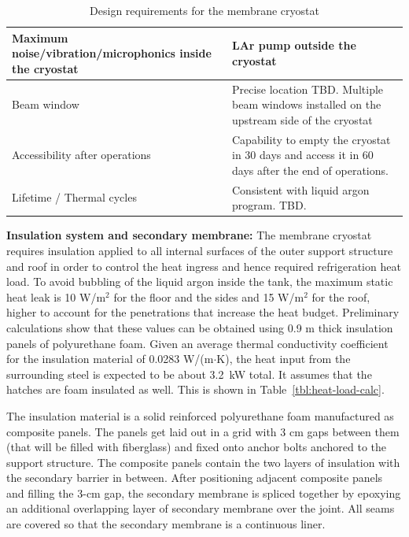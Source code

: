 \begin{table}[htpb]
\begin{tabular}{|p{}|p{}|}
Maximum noise/vibration/microphonics inside the cryostat   & LAr pump outside the cryostat  \\ \hline
Beam window   & Precise location TBD. Multiple beam windows installed on the upstream side of the cryostat  \\ \hline
 Accessibility after operations  & Capability to empty the cryostat in 30 days and access it in 60 days after the end of operations. \\ \hline
  Lifetime / Thermal cycles &  Consistent with liquid argon program. TBD. \\ \hline
 \end{tabular}
\caption{Design requirements for the membrane cryostat}
\label{tbl:cryogenics-design-parameters}
\end{table}

\textbf{Insulation system and secondary membrane: }
%
The membrane cryostat requires insulation applied to all internal surfaces of the outer support structure 
and roof in order to control the heat ingress and hence required refrigeration heat load. 
To avoid bubbling of the liquid argon inside the tank, the maximum static heat leak is 10 W/m$^2$ for the floor and the sides and 15 W/m$^2$ for the roof, higher to account for the penetrations that increase the heat budget. Preliminary calculations show that these values can be obtained using 0.9 m thick insulation panels of polyurethane foam.
Given an 
average thermal conductivity coefficient for the insulation material of 0.0283 W/(m$\cdot$K), the heat input 
from the surrounding steel is expected to be about 3.2~kW total. It assumes that the hatches are foam 
insulated as well. This is shown in Table~\ref{tbl:heat-load-calc}.

The insulation material is a solid reinforced polyurethane foam manufactured as composite panels. The 
panels get laid out in a grid with 3 cm gaps between them (that will be filled with fiberglass) and fixed 
onto anchor bolts anchored to the support structure. The composite panels contain the two layers of 
insulation with the secondary barrier in between. After positioning adjacent composite panels and filling 
the 3-cm gap, the secondary membrane is spliced together by epoxying an additional overlapping layer 
of secondary membrane over the joint. All seams are covered so that the secondary membrane is a 
continuous liner.

